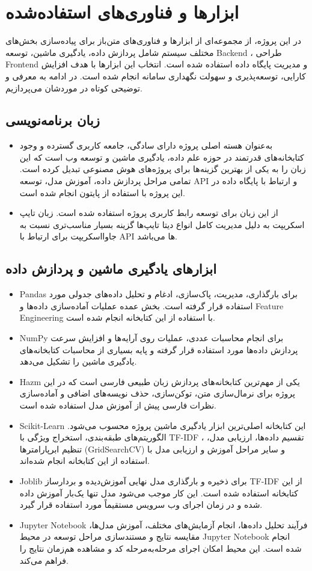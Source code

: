 \section{ابزارها و فناوری‌های استفاده‌شده}
در این پروژه، از مجموعه‌ای از ابزارها و فناوری‌های متن‌باز برای پیاده‌سازی بخش‌های مختلف سیستم شامل پردازش داده، یادگیری ماشین، توسعه Backend ، طراحی Frontend و مدیریت پایگاه داده استفاده شده است. انتخاب این ابزارها با هدف افزایش کارایی، توسعه‌پذیری و سهولت نگهداری سامانه انجام شده است. در ادامه به معرفی و توضیحی کوتاه در موردشان می‌پردازیم.
\subsection{زبان برنامه‌نویسی}
\begin{itemize}
	\item [Python] 
	به‌عنوان هسته اصلی پروژه دارای سادگی، جامعه کاربری گسترده و وجود کتابخانه‌های قدرتمند در حوزه علم داده، یادگیری ماشین و توسعه وب است که این زبان را به یکی از بهترین گزینه‌ها برای پروژه‌های هوش مصنوعی تبدیل کرده است. تمامی مراحل پردازش داده، آموزش مدل، توسعه API و ارتباط با پایگاه داده در این پروژه با استفاده از پایتون انجام شده است.
	\item[TypeScript] 
	از این زبان برای توسعه رابط کاربری پروژه استفاده شده است. زبان تایپ اسکریپت به دلیل مدیریت کامل انواع دیتا تایپ‌ها گزینه بسیار مناسب‌تری نسبت به جاوااسکریپت برای ارتباط با API ها می‌باشد.
\end{itemize}
\subsection{ابزارهای یادگیری ماشین و پردازش داده}
\begin{itemize}
	\item Pandas 
	برای بارگذاری، مدیریت، پاک‌سازی، ادغام و تحلیل داده‌های جدولی مورد استفاده قرار گرفته است. بخش عمده عملیات آماده‌سازی داده‌ها و Feature Engineering با استفاده از این کتابخانه انجام شده است.
	\item NumPy 
	برای انجام محاسبات عددی، عملیات روی آرایه‌ها و افزایش سرعت پردازش داده‌ها مورد استفاده قرار گرفته و پایه بسیاری از محاسبات کتابخانه‌های یادگیری ماشین را تشکیل می‌دهد.
	\item Hazm 
	یکی از مهم‌ترین کتابخانه‌های پردازش زبان طبیعی فارسی است که در این پروژه برای نرمال‌سازی متن، توکن‌سازی، حذف نویسه‌های اضافی و آماده‌سازی نظرات فارسی پیش از آموزش مدل استفاده شده است.
	\item Scikit-Learn 
	این کتابخانه اصلی‌ترین ابزار یادگیری ماشین پروژه محسوب می‌شود. الگوریتم‌های طبقه‌بندی، استخراج ویژگی با TF-IDF ، تقسیم داده‌ها، ارزیابی مدل، تنظیم ابرپارامترها (GridSearchCV) و سایر مراحل آموزش و ارزیابی مدل با استفاده از این کتابخانه انجام شده‌اند.
	\item Joblib 
	برای ذخیره و بارگذاری مدل نهایی آموزش‌دیده و بردارساز TF-IDF از این کتابخانه استفاده شده است. این کار موجب می‌شود مدل تنها یک‌بار آموزش داده شده و در زمان اجرای وب سرویس مستقیماً مورد استفاده قرار گیرد.
	\item Jupyter Notebook 
	فرآیند تحلیل داده‌ها، انجام آزمایش‌های مختلف، آموزش مدل‌ها، مقایسه نتایج و مستندسازی مراحل توسعه در محیط Jupyter Notebook انجام شده است. این محیط امکان اجرای مرحله‌به‌مرحله کد و مشاهده هم‌زمان نتایج را فراهم می‌کند.
\end{itemize}
